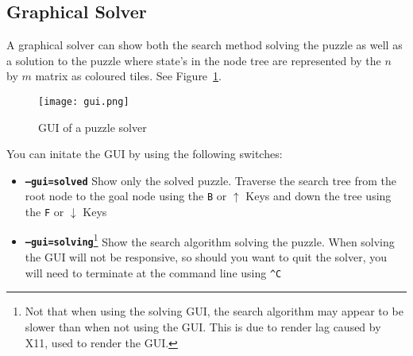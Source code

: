 \subsection{Graphical Solver}
\label{sub:Graphical Solver}


A graphical solver can show both the search method solving the puzzle
as well as a solution to the puzzle where state's in the node tree are
represented by the $n$ by $m$ matrix as coloured tiles. See Figure~\ref{fig:gui}.

\begin{figure}[h!]
  \centering
  \texttt{[image: gui.png]}
  \caption{GUI of a puzzle solver}
  \label{fig:gui}
\end{figure}

You can initate the GUI by using the following switches:

\begin{itemize}
  \item \texttt{\bfseries --gui=solved}
  Show only the solved puzzle. Traverse the search tree from the root node to
  the goal node using the \texttt{B} or $\uparrow$ Keys and down the tree using
  the \texttt{F} or $\downarrow$ Keys
  \item \texttt{\bfseries --gui=solving}\footnote{Not that when using the
  solving GUI, the search algorithm may appear to be slower than when not using
  the GUI. This is due to render lag caused by X11, used to render the GUI.}
  Show the search algorithm solving the puzzle. When solving the GUI will not be
  responsive, so should you want to quit the solver, you will need to terminate
  at the command line using \texttt{\^{}C}
\end{itemize}
